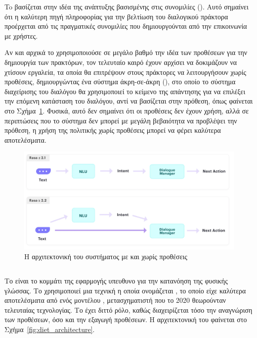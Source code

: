 To  βασίζεται στην ιδέα της ανάπτυξης βασισμένης στις συνομιλίες (). Αυτό σημαίνει ότι η καλύτερη πηγή πληροφορίας για την βελτίωση του διαλογικού πράκτορα προέρχεται από τις πραγματικές συνομιλίες που δημιουργούνται από την επικοινωνία με χρήστες.

Αν και αρχικά το  χρησιμοποιούσε σε μεγάλο βαθμό την ιδέα των προθέσεων για την δημιουργία των πρακτόρων, τον τελευταίο καιρό έχουν αρχίσει να δοκιμάζουν να χτίσουν εργαλεία, τα οποία θα επιτρέψουν στους πράκτορες να λειτουργήσουν χωρίς προθέσεις, δημιουργώντας ένα σύστημα άκρη-σε-άκρη (), στο οποίο το σύστημα διαχείρισης του διαλόγου θα χρησιμοποιεί το κείμενο της απάντησης για να επιλέξει την επόμενη κατάσταση του διαλόγου, αντί να βασίζεται στην πρόθεση, όπως φαίνεται στο Σχήμα~\ref{fig:rasa_intentless}. Φυσικά, αυτό δεν σημαίνει ότι οι προθέσεις δεν έχουν χρήση, αλλά σε περιπτώσεις που το σύστημα δεν μπορεί με μεγάλη βεβαιότητα να προβλέψει την πρόθεση, η χρήση της πολιτικής χωρίς προθέσεις μπορεί να φέρει καλύτερα αποτελέσματα.

\begin{figure}
    \centering
    \includegraphics[width=\textwidth]{body_matter/our_work/images/rasa_intentless.png}
    \caption{Η αρχιτεκτονική του συστήματος με και χωρίς προθέσεις}
    \label{fig:rasa_intentless}
\end{figure}


\subsection{}

Το  είναι το κομμάτι της εφαρμογής υπευθυνο για την κατανόηση της φυσικής γλώσσας. Το  χρησιμοποιεί μια τεχνική η οποία ονομάζεται , το οποίο είχε καλύτερα αποτελέσματα από  ενός μοντέλου , μετασχηματιστή που το 2020 θεωρούνταν τελευταίας τεχνολογίας. Το  έχει διττό ρόλο, καθώς διαχειρίζεται τόσο την αναγνώριση των προθέσεων, όσο και την εξαγωγή προθέσεων. H αρχιτεκτονική του  φαίνεται στο Σχήμα~\ref{fig:diet_architecture}.

